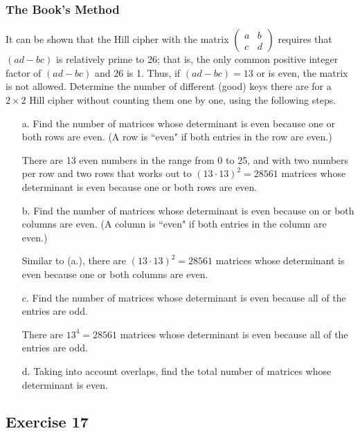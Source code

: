 \documentclass[12pt]{article}
\begin{document}
\subsubsection*{The Book's Method}
It can be shown that the Hill cipher with the matrix $\left(\begin{matrix} a & b \\ c & d\end{matrix}\right)$ requires that $\left(ad - bc\right)$ is relatively prime to 26; that is, the only common positive integer factor of $\left(ad - bc\right)$ and 26 is 1. Thus, if $\left(ad - bc\right) = 13$ or is even, the matrix is not allowed. Determine the number of different (good) keys there are for a $2 \times 2$ Hill cipher without counting them one by one, using the following steps.
\begin{itemize}
\item[a.] Find the number of matrices whose determinant is even because one or both rows are even. (A row is ``even" if both entries in the row are even.)

There are 13 even numbers in the range from 0 to 25, and with two numbers per row and two rows that works out to $\left(13 \cdot 13\right)^2 = 28561$ matrices whose determinant is even because one or both rows are even.

\item[b.] Find the number of matrices whose determinant is even because on or both columns are even. (A column is ``even" if both entries in the column are even.)

Similar to (a.), there are $\left(13 \cdot 13\right)^2 = 28561$ matrices whose determinant is even because one or both columns are even.

\item[c.] Find the number of matrices whose determinant is even because all of the entries are odd.

There are $13^4 = 28561$ matrices whose determinant is even because all of the entries are odd.

\item[d.] Taking into account overlaps, find the total number of matrices whose determinant is even.
\end{itemize}

\subsection*{Exercise 17}
\end{document}
